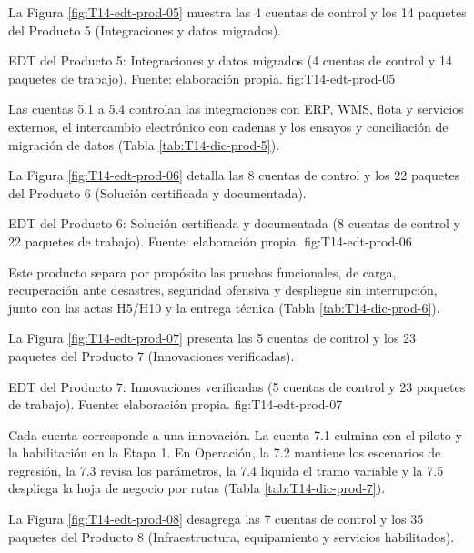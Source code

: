 \par\addvspace{\intextsep}\noindent\begin{minipage}{\linewidth}
La Figura \ref{fig:T14-edt-prod-05} muestra las 4 cuentas de control y los 14 paquetes del Producto 5 (Integraciones y datos migrados).

  {EDT del Producto 5: Integraciones y datos migrados (4 cuentas de control y 14 paquetes de trabajo). Fuente: elaboración propia.}
  {fig:T14-edt-prod-05}
\end{minipage}\par\addvspace{\intextsep}

Las cuentas 5.1 a 5.4 controlan las integraciones con ERP, WMS, flota y servicios externos, el intercambio electrónico con cadenas y los ensayos y conciliación de migración de datos (Tabla \ref{tab:T14-dic-prod-5}).

La Figura \ref{fig:T14-edt-prod-06} detalla las 8 cuentas de control y los 22 paquetes del Producto 6 (Solución certificada y documentada).

  {EDT del Producto 6: Solución certificada y documentada (8 cuentas de control y 22 paquetes de trabajo). Fuente: elaboración propia.}
  {fig:T14-edt-prod-06}

Este producto separa por propósito las pruebas funcionales, de carga, recuperación ante desastres, seguridad ofensiva y despliegue sin interrupción, junto con las actas H5/H10 y la entrega técnica (Tabla \ref{tab:T14-dic-prod-6}).

La Figura \ref{fig:T14-edt-prod-07} presenta las 5 cuentas de control y los 23 paquetes del Producto 7 (Innovaciones verificadas).

  {EDT del Producto 7: Innovaciones verificadas (5 cuentas de control y 23 paquetes de trabajo). Fuente: elaboración propia.}
  {fig:T14-edt-prod-07}

Cada cuenta corresponde a una innovación. La cuenta 7.1 culmina con el piloto y la habilitación en la Etapa 1. En Operación, la 7.2 mantiene los escenarios de regresión, la 7.3 revisa los parámetros, la 7.4 liquida el tramo variable y la 7.5 despliega la hoja de negocio por rutas (Tabla \ref{tab:T14-dic-prod-7}).

La Figura \ref{fig:T14-edt-prod-08} desagrega las 7 cuentas de control y los 35 paquetes del Producto 8 (Infraestructura, equipamiento y servicios habilitados).

